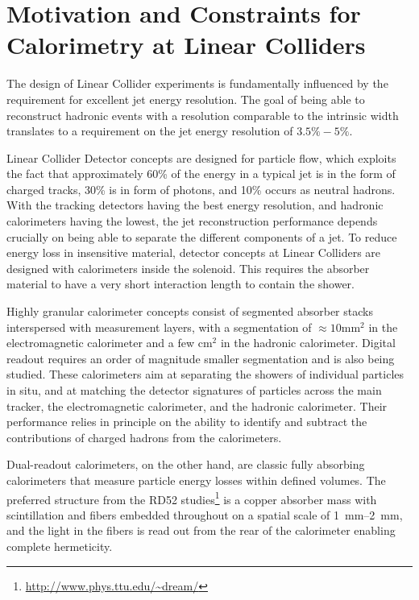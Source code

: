 \section{Motivation and Constraints for Calorimetry at Linear Colliders}

The design of Linear Collider experiments is fundamentally influenced by the requirement for excellent jet energy resolution. The goal of being able to reconstruct hadronic \PZ events with a resolution comparable to the intrinsic width translates to a requirement on the jet energy resolution of $3.5\%-5\%$.

Linear Collider Detector concepts are designed for particle flow, which exploits the fact that approximately 60\% of the energy in a typical jet is in the form of charged tracks, 30\% is in form of photons, and 10\% occurs as neutral hadrons. With the tracking detectors having the best energy resolution, and hadronic calorimeters having the lowest, the jet reconstruction performance depends crucially on being able to separate the different components of a jet. To reduce energy loss in insensitive material, detector concepts at Linear Colliders are designed with calorimeters inside the solenoid. This requires the absorber material to have a very short interaction length to contain the shower.

Highly granular calorimeter concepts consist of segmented absorber stacks interspersed with measurement layers, with a segmentation of $\approx 10\text{mm}^2$ in the electromagnetic calorimeter and a few $\text{cm}^2$ in the hadronic calorimeter. Digital readout requires an order of magnitude smaller segmentation and is also being studied. These calorimeters aim at separating the showers of individual particles in situ, and at matching the detector signatures of particles across the main tracker, the electromagnetic calorimeter, and the hadronic calorimeter. Their performance relies in principle on the ability to identify and subtract the contributions of charged hadrons from the calorimeters.

Dual-readout calorimeters, on the other hand, are classic fully absorbing calorimeters that measure particle energy losses within defined volumes. The preferred structure from the RD52 studies\footnote{\url{http://www.phys.ttu.edu/~dream/}} is a copper absorber mass with scintillation and \C fibers embedded throughout on a spatial scale of \SIrange{1}{2}{mm}, and the light in the fibers is read out from the rear of the calorimeter enabling complete hermeticity. 

